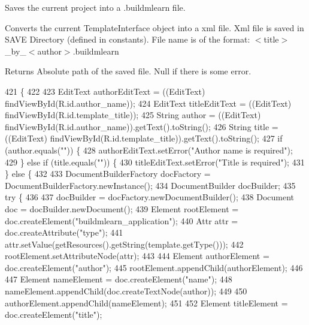 Saves the current project into a .buildmlearn file. 

Converts the current Template\-Interface object into a xml file. Xml file is saved in S\-A\-V\-E Directory (defined in constants). File name is of the format\-: $<$title$>$\-\_\-by\-\_\-$<$author$>$.\-buildmlearn

\begin{DoxyReturn}{Returns}
Absolute path of the saved file. Null if there is some error. 
\end{DoxyReturn}

\begin{DoxyCode}
421                                    \{
422 
423         EditText authorEditText = ((EditText) findViewById(R.id.author\_name));
424         EditText titleEditText = ((EditText) findViewById(R.id.template\_title));
425         String author = ((EditText) findViewById(R.id.author\_name)).getText().toString();
426         String title = ((EditText) findViewById(R.id.template\_title)).getText().toString();
427         \textcolor{keywordflow}{if} (author.equals(\textcolor{stringliteral}{""})) \{
428             authorEditText.setError(\textcolor{stringliteral}{"Author name is required"});
429         \} \textcolor{keywordflow}{else} \textcolor{keywordflow}{if} (title.equals(\textcolor{stringliteral}{""})) \{
430             titleEditText.setError(\textcolor{stringliteral}{"Title is required"});
431         \} \textcolor{keywordflow}{else} \{
432 
433             DocumentBuilderFactory docFactory = DocumentBuilderFactory.newInstance();
434             DocumentBuilder docBuilder;
435             \textcolor{keywordflow}{try} \{
436 
437                 docBuilder = docFactory.newDocumentBuilder();
438                 Document doc = docBuilder.newDocument();
439                 Element rootElement = doc.createElement(\textcolor{stringliteral}{"buildmlearn\_application"});
440                 Attr attr = doc.createAttribute(\textcolor{stringliteral}{"type"});
441                 attr.setValue(getResources().getString(template.getType()));
442                 rootElement.setAttributeNode(attr);
443 
444                 Element authorElement = doc.createElement(\textcolor{stringliteral}{"author"});
445                 rootElement.appendChild(authorElement);
446 
447                 Element nameElement = doc.createElement(\textcolor{stringliteral}{"name"});
448                 nameElement.appendChild(doc.createTextNode(author));
449 
450                 authorElement.appendChild(nameElement);
451 
452                 Element titleElement = doc.createElement(\textcolor{stringliteral}{"title"});

\end{DoxyCode}
